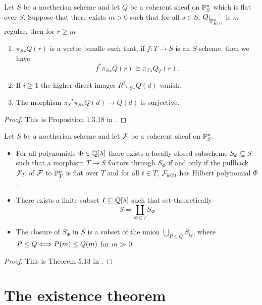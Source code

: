 \begin{proposition}\label{RegularityInFamilies}
Let $S$ be a noetherian scheme and let $Q$ be a coherent sheaf on $\mathbb{P}^n_S$ which is flat over $S$. Suppose that there exists $m>0$ such that for all $s\in S$, $Q\res{\Pj^n_{k(s)}}$ is $m$-regular, then for $r\geq m$
\begin{enumerate}
\item ${\pi_S}_\ast Q(r)$ is a vector bundle such that, if $f:T\to S$ is an $S$-scheme, then we have
\[f^\ast{\pi_S}_\ast Q(r)\cong {\pi_T}_\ast Q_T(r).\]
\item If $i\geq 1$ the higher direct images $R^i{\pi_S}_\ast Q(d)$ vanish.
\item The morphism ${\pi_S}^\ast{\pi_S}_\ast Q(d)\to Q(d)$ is surjective.
\end{enumerate}
\end{proposition}
\begin{proof}
This is Proposition 1.3.18 in \cite{Alper}.
\end{proof}


\begin{theorem}\label{FlatetningStratifications}
Let $S$ be a noetherian scheme and let $\mathcal{F}$ be a coherent sheaf on $\mathbb{P}^n_S$. 
\begin{itemize}
\item For all polynomials $\Phi\in\mathbb{Q}[\lambda]$ there exists a locally closed subscheme $S_\Phi\subseteq S$ such that a morphism $T\to S$ factors through $S_\Phi$ if and only if the pullback $\mathcal{F}_T$ of $\mathcal{F}$ to $\mathbb{P}^n_T$ is flat over $T$ and for all $t\in T$, $\mathcal{F}_{k(t)}$ has Hilbert polynomial $\Phi$.
\item There exists a finite subset $I\subseteq \mathbb{Q}[\lambda]$ such that set-theoretically
\[S=\coprod_{\Phi\in I}S_\Phi\]
\item The closure of $S_\Phi$ in $S$ is a subset of the union $\bigcup_{P\leq Q}S_Q$, where $P\leq Q\Longleftrightarrow P(m)\leq Q(m)$ for $m\gg 0$.
\end{itemize}
\end{theorem}
\begin{proof}
This is Theorem 5.13 in \cite{FGAEXPLAINED}.
\end{proof}



\section{The existence theorem}

